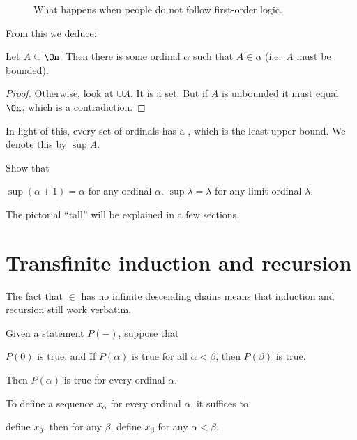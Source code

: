 \begin{figure}[ht]
	\centering
	\caption{What happens when people do not follow first-order logic.}
\end{figure}


From this we deduce:
\begin{theorem}
	Let $A \subseteq \On$.
	Then there is some ordinal $\alpha$ such that $A \in \alpha$
	(i.e.\ $A$ must be bounded).
\end{theorem}
\begin{proof}
	Otherwise, look at $\cup A$.
	It is a set.
	But if $A$ is unbounded it must equal $\On$,
	which is a contradiction.
\end{proof}
In light of this, every set of ordinals has a ,
which is the least upper bound. We denote this by $\sup A$.

\begin{ques}
	Show that
	\begin{enumerate}[(a)]
		\ii $\sup (\alpha+1) = \alpha$ for any ordinal $\alpha$.
		\ii $\sup \lambda = \lambda$ for any limit ordinal $\lambda$.
	\end{enumerate}
\end{ques}

The pictorial ``tall'' will be explained in a few sections.

\section{Transfinite induction and recursion}
The fact that $\in$ has no infinite descending chains means that induction and recursion still work verbatim.
\begin{theorem}
	Given a statement $P(-)$, suppose that
	\begin{itemize}
		\ii $P(0)$ is true, and
		\ii If $P(\alpha)$ is true for all $\alpha < \beta$, then $P(\beta)$ is true.
	\end{itemize}
	Then $P(\alpha)$ is true for every ordinal $\alpha$.
\end{theorem}
\begin{theorem}
	To define a sequence $x_\alpha$ for every ordinal $\alpha$,
	it suffices to
	\begin{itemize}
		\ii define $x_0$, then
		\ii for any $\beta$, define $x_\beta$ for any $\alpha < \beta$.
	\end{itemize}
\end{theorem}

